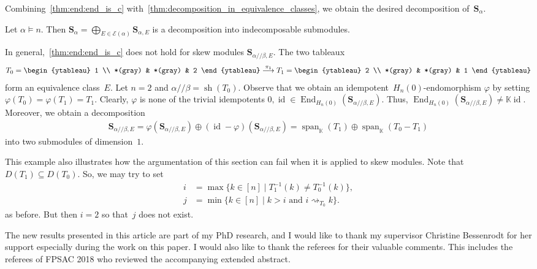 \documentclass[ALCO,ThmDefs,Unicode,epreuves]{cedram}
\newcommand{\bs}[1]{\boldsymbol{#1} }
\newcommand{\mc}[1]{\mathcal{#1} }
\newcommand{\K}{\mathbb K}
\DeclareMathOperator{\id}{id}
\DeclareMathOperator{\sh}{sh}
\DeclareMathOperator{\End}{End}
\newcommand{\spa}{\operatorname{span}}
\newcommand{\He}{H_n(0)}
\newcommand{\ab}{{\alpha / \! \! / \beta}}
\newcommand{\att}{\rightsquigarrow}
\newcommand{\sa}{\bs S_{\alpha}}
\newcommand{\se}{\bs S_{\alpha,E}}
\newcommand{\sse}{\bs S_{\ab,E}}
\begin{document}
Combining~\cref{thm:end:end_is_c} with~\cref{thm:decomposition_in_equivalence_classes}, we obtain the desired decomposition of~$\sa$.

\begin{coro}
	Let $\alpha \vDash n$. Then $\sa = \bigoplus_{E\in \mc E(\alpha)} \se$ is a decomposition into indecomposable submodules.
\end{coro}

\begin{exam}
	\label{exa:decomposable_module}
	 In general,~\cref{thm:end:end_is_c} does not hold for skew modules $\sse$.
	The two tableaux
	\begin{align*}
	T_0 =
	\begin{ytableau}
	1 \\
	*(gray) & *(gray) & 2
	\end{ytableau}
	\overset{\pi_1}{\longrightarrow}
	T_1 = 
	\begin{ytableau}
	2 \\
	*(gray) & *(gray) & 1
	\end{ytableau}
	\end{align*}
	form an equivalence class~$E$. Let $n=2$ and $\ab=\sh(T_0)$. 
	Observe that we obtain an idempotent~$\He$-endomorphism $\varphi$ by setting $\varphi(T_0) = \varphi(T_1) = T_1$.
	 Clearly, $\varphi$ is none of the trivial idempotents $0,\id\in \End_{\He}(\sse)$. Thus, $\End_{\He}(\sse)\neq \K\id$. Moreover, we obtain a decomposition
	\begin{align*}
	\sse = \varphi(\sse) \oplus (\id -\varphi) (\sse) = \spa_\K(T_1) \oplus \spa_\K(T_0-T_1)
	\end{align*} 
	into two submodules of dimension~$1$.
	
	This example also illustrates how the argumentation of this section can fail when it is applied to skew modules. Note that $D(T_1) \subseteq D(T_0)$. So, we may try to set
	 \begin{align*}
		i &= \max \big\{ k \in [n] \mid T_1^{-1}(k) \neq T^{-1}_0(k) \big\}, \\
		j &= \min \big\{k \in [n] \mid k>i \text{ and } i\att_{T_0} k \big\}.
	\end{align*}
	as before.
	But then $i=2$ so that~$j$ does not exist. 
\end{exam}

\begin{longthanks} 
	The new results presented in this article are part of my PhD research, and I would like to thank my supervisor Christine Bessenrodt for her support especially during the work on this paper. 
 	I would also like to thank the referees for their valuable comments.
 	This includes the referees of FPSAC 2018 who reviewed the accompanying extended abstract.
\end{longthanks}



\end{document}
